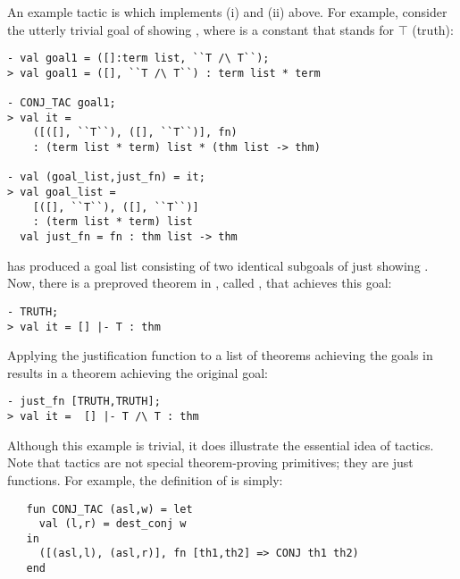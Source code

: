 An example tactic is  which implements (i) and (ii) above.
For example, consider the utterly trivial goal of showing , where  is a constant that stands for $\top$ (truth):

\begin{session}
\begin{verbatim}
- val goal1 = ([]:term list, ``T /\ T``);
> val goal1 = ([], ``T /\ T``) : term list * term

- CONJ_TAC goal1;
> val it =
    ([([], ``T``), ([], ``T``)], fn)
    : (term list * term) list * (thm list -> thm)

- val (goal_list,just_fn) = it;
> val goal_list =
    [([], ``T``), ([], ``T``)]
    : (term list * term) list
  val just_fn = fn : thm list -> thm
\end{verbatim}
\end{session}

\noindent {} has produced a goal  list consisting  of two identical
subgoals of just showing .  Now, there is a preproved
theorem in \HOL, called , that achieves this goal:

\begin{session}
\begin{verbatim}
- TRUTH;
> val it = [] |- T : thm
\end{verbatim}
\end{session}

\noindent Applying the justification function  to a list
of theorems achieving the goals in  results
in a theorem achieving the original goal:

\begin{session}
\begin{verbatim}
- just_fn [TRUTH,TRUTH];
> val it =  [] |- T /\ T : thm
\end{verbatim}
\end{session}

    Although this example is trivial, it does illustrate the essential
    idea of tactics.  Note that tactics are not special
    theorem-proving primitives; they are just \ML{} functions.  For
    example, the definition of  is simply:

\begin{hol}
\begin{verbatim}
   fun CONJ_TAC (asl,w) = let
     val (l,r) = dest_conj w
   in
     ([(asl,l), (asl,r)], fn [th1,th2] => CONJ th1 th2)
   end
\end{verbatim}
\end{hol}

